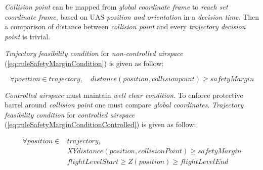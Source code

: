 \emph{Collision point} can be mapped from \emph{global coordinate frame} to \emph{reach set coordinate frame}, based on UAS \emph{position and orientation} in a \emph{decision time}. Then a comparison of distance between \emph{collision point} and every \emph{trajectory decision point} is trivial. 

\emph{Trajectory feasibility condition}  for \emph{non-controlled airspace} (\ref{eq:ruleSafetyMarginCondition}) is given as follow:

\begin{equation}\label{eq:ruleSafetyMarginCondition}
    \forall position \in trajectory, \quad distance(position,collision point) \ge safetyMargin
\end{equation}

\noindent\emph{Controlled airspace} must maintain \emph{well clear condition}. To enforce protective barrel around \emph{collision point} one must compare \emph{global coordinates}.
\emph{Trajectory feasibility condition}  for \emph{controlled airspace} (\ref{eq:ruleSafetyMarginConditionControlled}) is given as follow:

\begin{equation}\label{eq:ruleSafetyMarginConditionControlled}
    \begin{aligned}
        \forall position \in &trajectory,\\
        &XYdistance(position,collisionPoint) \ge safetyMargin\\
        &flightLevelStart \ge Z(position) \ge flightLevelEnd
    \end{aligned}
\end{equation}

